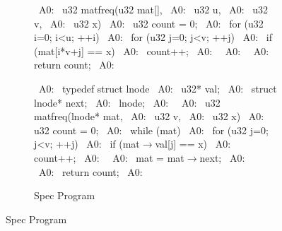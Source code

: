 \begin{figure}[H]
\begin{minipage}[c]{0.50\textwidth}
\begin{subfigure}[b]{\textwidth}
\begin{center}
\begin{allLangEnvScript}
~{\tiny \textcolor{mygray}{A0:}}~ u32 matfreq(u32 mat[],
~{\tiny \textcolor{mygray}{A0:}}~             u32 u,
~{\tiny \textcolor{mygray}{A0:}}~             u32 v,
~{\tiny \textcolor{mygray}{A0:}}~             u32 x) {
~{\tiny \textcolor{mygray}{A0:}}~   u32 count = 0;
~{\tiny \textcolor{mygray}{A0:}}~   for (u32 i=0; i<u; ++i) {
~{\tiny \textcolor{mygray}{A0:}}~     for (u32 j=0; j<v; ++j) {
~{\tiny \textcolor{mygray}{A0:}}~       if (mat[i*v+j] == x)
~{\tiny \textcolor{mygray}{A0:}}~         count++;
~{\tiny \textcolor{mygray}{A0:}}~     }
~{\tiny \textcolor{mygray}{A0:}}~   }
~{\tiny \textcolor{mygray}{A0:}}~   return count;
~{\tiny \textcolor{mygray}{A0:}}~ }
\end{allLangEnvScript}
\end{center}
\end{subfigure}
\begin{subfigure}[b]{\textwidth}
\begin{center}
\begin{allLangEnvScript}
~{\tiny \textcolor{mygray}{A0:}}~ typedef struct lnode {
~{\tiny \textcolor{mygray}{A0:}}~   u32* val;
~{\tiny \textcolor{mygray}{A0:}}~   struct lnode* next;
~{\tiny \textcolor{mygray}{A0:}}~ } lnode;
~{\tiny \textcolor{mygray}{A0:}}~ 
~{\tiny \textcolor{mygray}{A0:}}~ u32 matfreq(lnode* mat,
~{\tiny \textcolor{mygray}{A0:}}~             u32 v,
~{\tiny \textcolor{mygray}{A0:}}~             u32 x) {
~{\tiny \textcolor{mygray}{A0:}}~   u32 count = 0;
~{\tiny \textcolor{mygray}{A0:}}~   while (mat) {
~{\tiny \textcolor{mygray}{A0:}}~     for (u32 j=0; j<v; ++j) {
~{\tiny \textcolor{mygray}{A0:}}~       if (mat$\rightarrow$val[j] == x)
~{\tiny \textcolor{mygray}{A0:}}~         count++;
~{\tiny \textcolor{mygray}{A0:}}~     }
~{\tiny \textcolor{mygray}{A0:}}~     mat = mat$\rightarrow$next;
~{\tiny \textcolor{mygray}{A0:}}~   }
~{\tiny \textcolor{mygray}{A0:}}~   return count;
~{\tiny \textcolor{mygray}{A0:}}~ }
\end{allLangEnvScript}
\end{center}
\vspace{-15px}
\caption{\label{fig:x}Spec Program}
\end{subfigure}%
\end{minipage}%

\end{figure}
